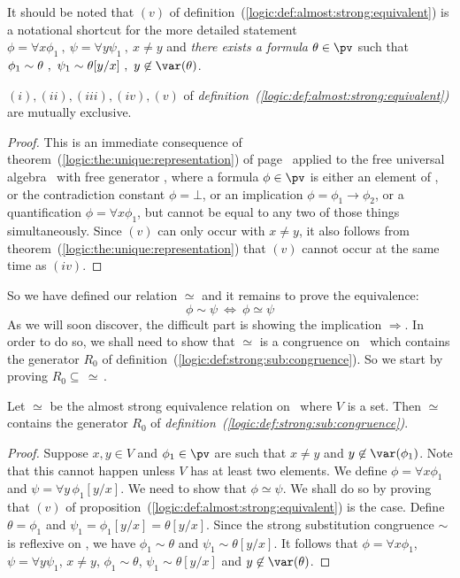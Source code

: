 It should be noted that $(v)$ of
definition~(\ref{logic:def:almost:strong:equivalent}) is a
notational shortcut for the more detailed statement $\phi=\forall
x\phi_{1}\ ,\ \psi=\forall y\psi_{1}\ ,\ x\neq y$ and {\em there
exists a formula} $\theta\in\pv$ such that $\phi_{1}\sim \theta\ ,\
\psi_{1}\sim \theta[y/x]\ ,\ y\not\in\var(\theta)$.

\begin{prop}
$(i),(ii),(iii),(iv), (v)$ of {\em
definition~(\ref{logic:def:almost:strong:equivalent})} are mutually
exclusive.
\end{prop}

\noindent
\begin{proof}
This is an immediate consequence of
theorem~(\ref{logic:the:unique:representation}) of
page~\pageref{logic:the:unique:representation} applied to the free
universal algebra \pv\ with free generator \pvo, where a formula
$\phi\in\pv$ is either an element of \pvo, or the contradiction
constant $\phi=\bot$, or an implication $\phi=\phi_{1}\to\phi_{2}$,
or a quantification $\phi=\forall x\phi_{1}$, but cannot be equal to
any two of those things simultaneously. Since $(v)$ can only occur
with $x\neq y$, it also follows from
theorem~(\ref{logic:the:unique:representation}) that $(v)$ cannot
occur at the same time as $(iv)$.
\end{proof}

So we have defined our relation $\simeq$ and it remains to prove the
equivalence:
    \[
    \phi\sim\psi\ \Leftrightarrow\ \phi\simeq\psi
    \]
As we will soon discover, the difficult part is showing the
implication $\Rightarrow$. In order to do so, we shall need to show
that $\simeq$ is a congruence on \pv\ which contains the generator
$R_{0}$ of definition~(\ref{logic:def:strong:sub:congruence}). So we
start by proving $R_{0}\subseteq\,\simeq$\,.

\begin{prop}\label{logic:prop:almost:strong:contains:r0}
Let $\simeq$ be the almost strong equivalence relation on \pv\ where
$V$ is a set. Then $\simeq$ contains the generator $R_{0}$ of {\em
definition~(\ref{logic:def:strong:sub:congruence})}.
\end{prop}

\noindent
\begin{proof}
Suppose $x,y\in V$ and $\phi_{1}\in\pv$ are such that $x\neq y$ and
$y\not\in\var(\phi_{1})$. Note that this cannot happen unless $V$
has at least two elements. We define $\phi=\forall x\phi_{1}$ and
$\psi=\forall y\,\phi_{1}[y/x]$. We need to show that
$\phi\simeq\psi$. We shall do so by proving that $(v)$ of
proposition~(\ref{logic:def:almost:strong:equivalent}) is the case.
Define  $\theta=\phi_{1}$ and $\psi_{1}=\phi_{1}[y/x]=\theta[y/x]$.
Since the strong substitution congruence $\sim$ is reflexive on \pv,
we have $\phi_{1}\sim\theta$ and $\psi_{1}\sim\theta[y/x]$. It
follows that $\phi=\forall x\phi_{1}$, $\psi=\forall y\psi_{1}$,
$x\neq y$, $\phi_{1}\sim\theta$, $\psi_{1}\sim\theta[y/x]$ and
$y\not\in\var(\theta)$.
\end{proof}

